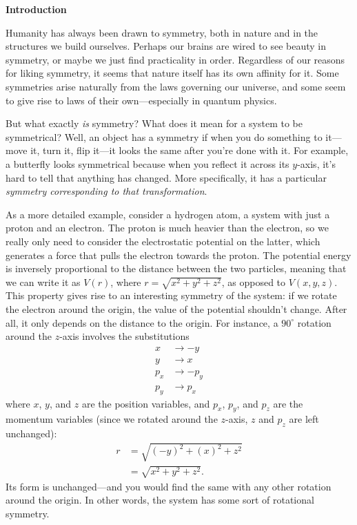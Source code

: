 
\noindent
\textbf{Introduction}

Humanity has always been drawn to symmetry, both in nature and in the structures we build ourselves. Perhaps our brains are wired to see beauty in symmetry, or maybe we just find practicality in order. Regardless of our reasons for liking symmetry, it seems that nature itself has its own affinity for it. Some symmetries arise naturally from the laws governing our universe, and some seem to give rise to laws of their own---especially in quantum physics. 

But what exactly \emph{is} symmetry? What does it mean for a system to be symmetrical? Well, an object has a symmetry if when you do something to it---move it, turn it, flip it---it looks the same after you're done with it. For example, a butterfly looks symmetrical because when you reflect it across its $y$-axis, it's hard to tell that anything has changed. More specifically, it has a particular \emph{symmetry corresponding to that transformation}.

As a more detailed example, consider a hydrogen atom, a system with just a proton and an electron. The proton is much heavier than the electron, so we really only need to consider the electrostatic potential on the latter, which generates a force that pulls the electron towards the proton. The potential energy is inversely proportional to the distance between the two particles, meaning that we can write it as $V(r)$, where $r = \sqrt{x^2 + y^2 + z^2}$, as opposed to $V(x, y, z)$. This property gives rise to an interesting symmetry of the system: if we rotate the electron around the origin, the value of the potential shouldn't change. After all, it only depends on the distance to the origin. For instance, a $90^{\circ}$ rotation around the $z$-axis involves the substitutions
\begin{align*}
    x &\rightarrow -y \\
    y &\rightarrow x \\
    p_x &\rightarrow -p_y \\
    p_y &\rightarrow p_x
\end{align*}
where $x$, $y$, and $z$ are the position variables, and $p_x$, $p_y$, and $p_z$ are the momentum variables (since we rotated around the $z$-axis, $z$ and $p_z$ are left unchanged):
\begin{align*}
    r &= \sqrt{(-y)^2 + (x)^2 + z^2} \\
    &= \sqrt{x^2 + y^2 + z^2}.
\end{align*}
Its form is unchanged---and you would find the same with any other rotation around the origin. In other words, the system has some sort of rotational symmetry.

